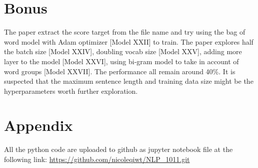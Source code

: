 \documentclass[10pt]{article}
\begin{document}
\section{Bonus}
The paper extract the score target from the file name and try using the bag of word model with Adam optimizer [Model XXII] to train. The paper explores half the batch size [Model XXIV], doubling vocab size [Model XXV], adding more layer to the model [Model XXVI], using bi-gram model to take in account of word groups [Model XXVII]. The performance all remain around 40\%. It is suspected that the maximum sentence length and training data size might be the hyperparameters worth further exploration.

\section{Appendix}

All the python code are uploaded to github as jupyter notebook file at the following link:
\url{https://github.com/nicoleqiwt/NLP_1011.git}
\end{document}

